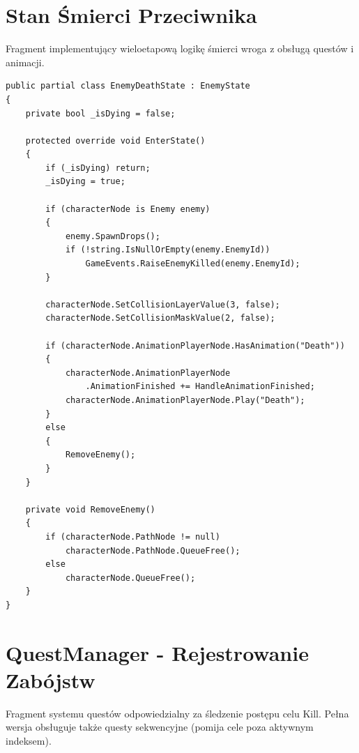 \section{Stan Śmierci Przeciwnika}

Fragment implementujący wieloetapową logikę śmierci wroga z obsługą questów i animacji.

\begin{lstlisting}[caption={EnemyDeathState.cs - wieloetapowa smierc wroga},label={lst:death}]
public partial class EnemyDeathState : EnemyState
{
    private bool _isDying = false;

    protected override void EnterState()
    {
        if (_isDying) return;
        _isDying = true;

        if (characterNode is Enemy enemy)
        {
            enemy.SpawnDrops();
            if (!string.IsNullOrEmpty(enemy.EnemyId))
                GameEvents.RaiseEnemyKilled(enemy.EnemyId);
        }

        characterNode.SetCollisionLayerValue(3, false);
        characterNode.SetCollisionMaskValue(2, false);

        if (characterNode.AnimationPlayerNode.HasAnimation("Death"))
        {
            characterNode.AnimationPlayerNode
                .AnimationFinished += HandleAnimationFinished;
            characterNode.AnimationPlayerNode.Play("Death");
        }
        else
        {
            RemoveEnemy();
        }
    }

    private void RemoveEnemy()
    {
        if (characterNode.PathNode != null)
            characterNode.PathNode.QueueFree();
        else
            characterNode.QueueFree();
    }
}
\end{lstlisting}

\section{QuestManager - Rejestrowanie Zabójstw}

Fragment systemu questów odpowiedzialny za śledzenie postępu celu Kill. Pełna wersja obsługuje także questy sekwencyjne (pomija cele poza aktywnym indeksem).

